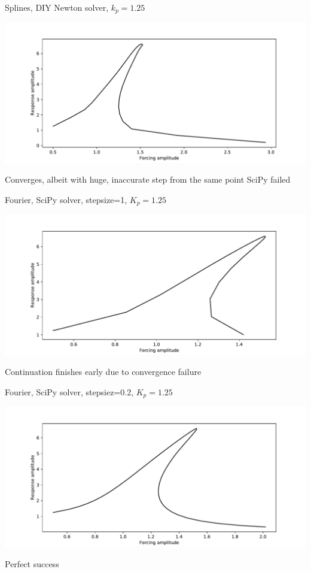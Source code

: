 \documentclass[presentation]{beamer}
\begin{document}
\begin{frame}[label={sec:orgceb72e3}]{Splines, DIY Newton solver, \(k_p=1.25\)}
\begin{center}
\includegraphics[width=.9\linewidth]{./kp1d25_transtime100_newton.pdf}
\end{center}

Converges, albeit with huge, inaccurate step from the same point SciPy failed
\end{frame}

\begin{frame}[label={sec:orgd2abd0c}]{Fourier, SciPy solver, stepsize=1, \(K_p=1.25\)}
\begin{center}
\includegraphics[width=.9\linewidth]{./kp1d25_transtime100_scipy_fourier.pdf}
\end{center}

Continuation finishes early due to convergence failure
\end{frame}

\begin{frame}[label={sec:org5650e9a}]{Fourier, SciPy solver, stepsiez=0.2, \(K_p=1.25\)}
\begin{center}
\includegraphics[width=.9\linewidth]{./kp1d25_transtime100_scipy_fourier_ss0d2.pdf}
\end{center}

Perfect success
\end{frame}
\end{document}
